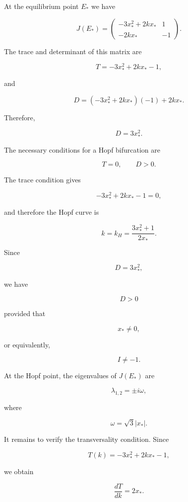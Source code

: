 \documentclass[11pt,reqno]{amsart}
\theoremstyle{plain}
\theoremstyle{definition}
\theoremstyle{remark}
\begin{document}
At the equilibrium point $E_*$ we have

\[
J(E_*)=
\begin{pmatrix}
-3x_*^2+2kx_*&1\\
-2kx_*&-1
\end{pmatrix}.
\]

The trace and determinant of this matrix are

\begin{equation}
\label{eq:trace}
T=-3x_*^2+2kx_*-1,
\end{equation}

and

\begin{equation}
\label{eq:det}
D=
(-3x_*^2+2kx_*)(-1)+2kx_*.
\end{equation}

Therefore,

\[
D=3x_*^2.
\]

The necessary conditions for a Hopf bifurcation are

\[
T=0,\qquad D>0.
\]

The trace condition gives

\[
-3x_*^2+2kx_*-1=0,
\]

and therefore the Hopf curve is

\begin{equation}
\label{eq:Hopfcurve}
k=k_H=
\frac{3x_*^2+1}{2x_*}.
\end{equation}

Since

\[
D=3x_*^2,
\]

we have

\[
D>0
\]

provided that

\[
x_*\neq0,
\]

or equivalently,

\[
I\neq -1.
\]

At the Hopf point, the eigenvalues of $J(E_*)$ are

\[
\lambda_{1,2}=\pm i\omega,
\]

where

\begin{equation}
\label{eq:omega}
\omega=\sqrt{3}|x_*|.
\end{equation}


It remains to verify the transversality condition. Since

\[
T(k)=-3x_*^2+2kx_*-1,
\]

we obtain

\[
\frac{dT}{dk}=2x_*.
\]
\end{document}
